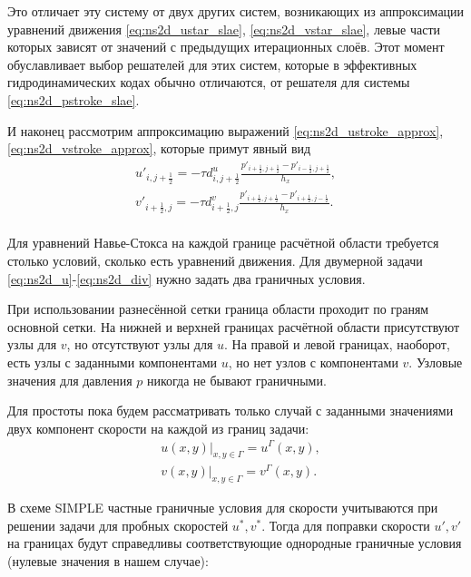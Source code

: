 Это отличает эту систему от двух других систем, возникающих
из аппроксимации уравнений движения \eqref{eq:ns2d_ustar_slae}, \eqref{eq:ns2d_vstar_slae},
левые части которых зависят от значений с предыдущих
итерационных слоёв. Этот момент обуславливает выбор
решателей для этих систем, которые в эффективных гидродинамических кодах обычно
отличаются, от решателя для системы \eqref{eq:ns2d_pstroke_slae}.


И наконец рассмотрим аппроксимацию выражений \eqref{eq:ns2d_ustroke_approx},
\eqref{eq:ns2d_vstroke_approx}, которые примут явный вид
\begin{align}
    \label{eq:ns2d_ustroke_discr}
    u'_{i,j+\tfrac12} = -\tau d^u_{i,j+\tfrac12} \frac{p'_{i+\tfrac12,j+\tfrac12} - p'_{i-\tfrac12, j+\tfrac12}}{h_x}, \\[10pt]
    \label{eq:ns2d_vstroke_discr}
    v'_{i+\tfrac12,j} = -\tau d^v_{i+\tfrac12,j} \frac{p'_{i+\tfrac12,j+\tfrac12} - p'_{i+\tfrac12, j-\tfrac12}}{h_x}. \\[10pt]
\end{align}

\label{sec:simple-bc}

Для уравнений Навье-Стокса на каждой границе расчётной области
требуется столько условий, сколько есть уравнений движения.
Для двумерной задачи \eqref{eq:ns2d_u}-\eqref{eq:ns2d_div}
нужно задать два граничных условия.

При использовании разнесённой сетки граница области проходит
по граням основной сетки. 
На нижней и верхней границах расчётной области
присутствуют узлы для $v$, но отсутствуют
узлы для $u$.
На правой и левой границах, наоборот,
есть узлы с заданными компонентами $u$,
но нет узлов с компонентами $v$.
Узловые значения для давления $p$
никогда не бывают граничными.

Для простоты пока будем рассматривать только случай с заданными значениями
двух компонент скорости на каждой из границ задачи:
\begin{align*}
    &\left. u(x, y) \right|_{x,y\in\Gamma} = u^\Gamma(x, y), \\
    &\left. v(x, y) \right|_{x,y\in\Gamma} = v^\Gamma(x, y).
\end{align*}

В схеме SIMPLE частные граничные условия 
для скорости учитываются при решении задачи
для пробных скоростей $u^*, v^*$.
Тогда для поправки скорости $u', v'$ на границах
будут справедливы соответствующие однородные граничные условия (нулевые значения в нашем случае):

